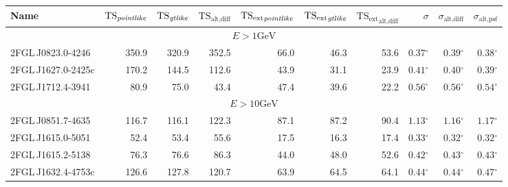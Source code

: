 \documentclass[12pt,preprint]{aastex}
\newcommand{\gev}{\text{GeV}\xspace}
\newcommand{\tsext}{{\ensuremath{\text{TS}_{\text{ext}}}}\xspace}
\newcommand{\ts}{\text{TS}\xspace}
\newcommand{\altdiff}{\text{alt,diff}\xspace}
\newcommand{\altpsf}{\text{alt,psf}\xspace}
\renewcommand{\deg}{\ensuremath{^\circ}\xspace}
\newcommand{\pointlike}{\text{\em pointlike}\xspace}
\newcommand{\gtlike}{\text{\em gtlike}\xspace}
\begin{document}
  \clearpage
  \begin{table}
    \begin{centering}
      \begin{tabular}{l|rrr|rrr|rrr}
        \hline
        \hline
        Name                 &     $\ts_\pointlike$ &        $\ts_\gtlike$ &       $\ts_\altdiff$ &      $\tsext_\pointlike$ &       $\tsext_\gtlike$ &    $\tsext_\altdiff$ &                $\sigma$ &       $\sigma_\altdiff$ &        $\sigma_\altpsf$ \\
        \hline
        \multicolumn{10}{c}{$E > 1 \gev$} \\
        \hline
        2FGL\,J0823.0-4246   &                350.9 &                320.9 &                352.5 &                     66.0 &                   46.3 &                 53.6 & $             0.37\deg$ & $             0.39\deg$ & $             0.38\deg$ \\
        2FGL\,J1627.0-2425c  &                170.2 &                144.5 &                112.6 &                     43.9 &                   31.1 &                 23.9 & $             0.41\deg$ & $             0.40\deg$ & $             0.39\deg$ \\
        2FGL\,J1712.4-3941   &                 80.9 &                 75.0 &                 43.4 &                     47.4 &                   39.6 &                 22.2 & $             0.56\deg$ & $             0.56\deg$ & $             0.54\deg$ \\
        \hline
        \multicolumn{10}{c}{$E > 10 \gev$} \\
        \hline
        2FGL\,J0851.7-4635   &                116.7 &                116.1 &                122.3 &                     87.1 &                   87.2 &                 90.4 & $             1.13\deg$ & $             1.16\deg$ & $             1.17\deg$ \\
        2FGL\,J1615.0-5051   &                 52.4 &                 53.4 &                 55.6 &                     17.5 &                   16.3 &                 17.4 & $             0.33\deg$ & $             0.32\deg$ & $             0.32\deg$ \\
        2FGL\,J1615.2-5138   &                 76.3 &                 76.6 &                 86.3 &                     44.0 &                   48.0 &                 52.6 & $             0.42\deg$ & $             0.43\deg$ & $             0.43\deg$ \\
        2FGL\,J1632.4-4753c  &                126.6 &                127.8 &                120.7 &                     63.9 &                   64.5 &                 64.1 & $             0.44\deg$ & $             0.44\deg$ & $             0.47\deg$ \\

\end{tabular}
\end{centering}
\end{table}
\end{document}
